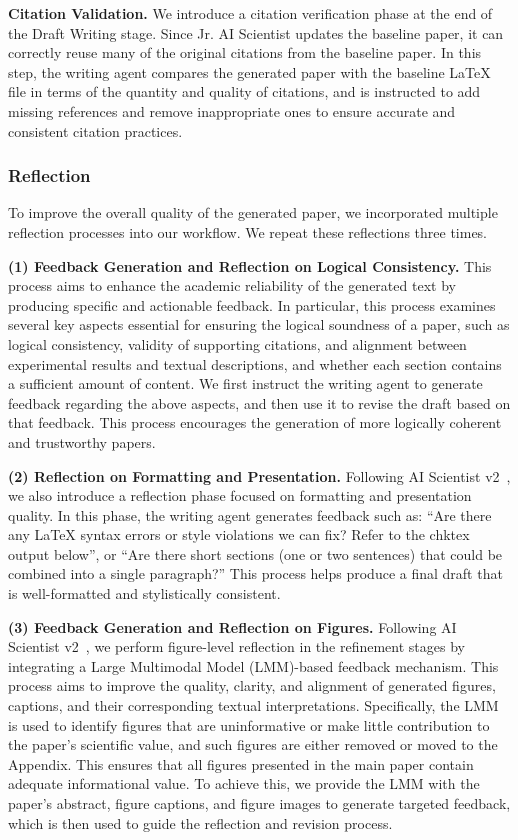 \textbf{Citation Validation.}
We introduce a citation verification phase at the end of the Draft Writing stage.
Since Jr. AI Scientist updates the baseline paper, it can correctly reuse many of the original citations from the baseline paper.
In this step, the writing agent compares the generated paper with the baseline LaTeX file in terms of the quantity and quality of citations, and is instructed to add missing references and remove inappropriate ones to ensure accurate and consistent citation practices.


\subsubsection{Reflection}
To improve the overall quality of the generated paper, we incorporated multiple reflection processes into our workflow.
We repeat these reflections three times.

\textbf{(1) Feedback Generation and Reflection on Logical Consistency.}
This process aims to enhance the academic reliability of the generated text by producing specific and actionable feedback.
In particular, this process examines several key aspects essential for ensuring the logical soundness of a paper, such as logical consistency, validity of supporting citations, and alignment between experimental results and textual descriptions, and whether each section contains a sufficient amount of content.
We first instruct the writing agent to generate feedback regarding the above aspects, and then use it to revise the draft based on that feedback. This process encourages the generation of more logically coherent and trustworthy papers.

\textbf{(2) Reflection on Formatting and Presentation.}
Following AI Scientist v2~\citep{yamada2025ai}, we also introduce a reflection phase focused on formatting and presentation quality.
In this phase, the writing agent generates feedback such as:
``Are there any LaTeX syntax errors or style violations we can fix? Refer to the chktex output below'', or
``Are there short sections (one or two sentences) that could be combined into a single paragraph?''
This process helps produce a final draft that is well-formatted and stylistically consistent.


\textbf{(3) Feedback Generation and Reflection on Figures.}
Following AI Scientist v2~\citep{yamada2025ai}, we perform figure-level reflection in the refinement stages by integrating a Large Multimodal Model (LMM)-based feedback mechanism.
This process aims to improve the quality, clarity, and alignment of generated figures, captions, and their corresponding textual interpretations.
Specifically, the LMM is used to identify figures that are uninformative or make little contribution to the paper's scientific value, and such figures are either removed or moved to the Appendix.
This ensures that all figures presented in the main paper contain adequate informational value.
To achieve this, we provide the LMM with the paper's abstract, figure captions, and figure images to generate targeted feedback, which is then used to guide the reflection and revision process.

